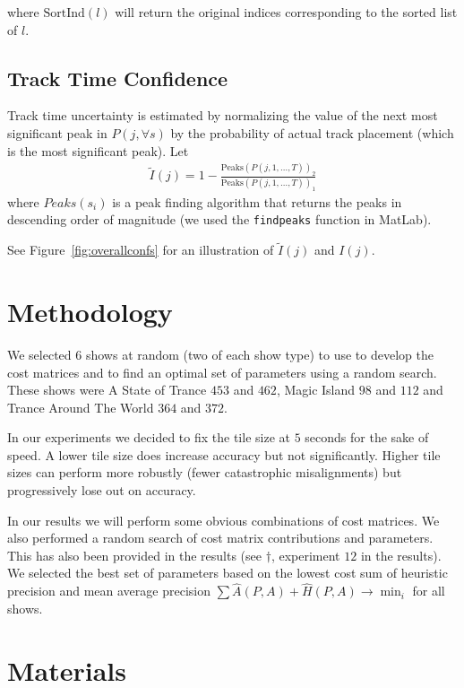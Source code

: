 \documentclass[twocolumn]{article}
\begin{document}
where $\mathrm{SortInd}(l)$ will return the original indices corresponding to the sorted list of $l$. 

\subsection{Track Time Confidence}

Track time uncertainty is estimated by normalizing the value of the next most significant peak in $P(j,\forall s)$ by the probability of actual track placement (which is the most significant peak). 
Let 
\begin{align*}
\tilde I( j ) = 1-\frac{ \mathrm{Peaks}( P(j, 1,\ldots,T ) )_2 } { \mathrm{Peaks}( P(j, 1,\ldots,T ))_1 }
\end{align*} where $Peaks(s_i)$ is a peak finding algorithm that returns the peaks in descending order of magnitude (we used the \texttt{findpeaks} function in MatLab).

See Figure~\ref{fig:overallconfs} for an illustration of $\tilde I( j )$ and $I( j )$.

\section{Methodology}\label{sec:methodology}

We selected $6$ shows at random (two of each show type) to use to develop the cost matrices and to find an optimal set of parameters using a random search. These shows were A State of Trance $453$ and $462$, Magic Island $98$ and $112$ and Trance Around The World $364$ and $372$.  

In our experiments we decided to fix the tile size at $5$ seconds for the sake of speed. A lower tile size does increase accuracy but not significantly. Higher tile sizes can perform more robustly (fewer catastrophic misalignments) but progressively lose out on accuracy.

In our results we will perform some obvious combinations of cost matrices. We also performed a random search of cost matrix contributions and parameters. This has also been provided in the results (see $\dagger$, experiment $12$ in the results). We selected the best set of parameters based on the lowest cost sum of heuristic precision and mean average precision $\sum \hat A(P,A) + \hat H(P,A) \rightarrow \min_i$ for all shows. 

\section{Materials}\label{sec:materials}
\end{document}
